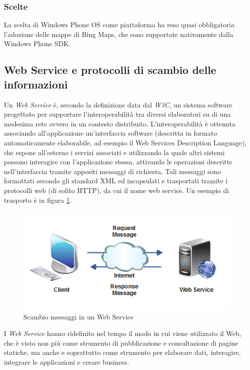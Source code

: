 \subsubsection{Scelte}
La scelta di Windows Phone OS come piattaforma ha reso quasi obbligatoria l'adozione delle mappe di Bing Maps, che sono supportate nativamente dalla Windows Phone SDK.

\clearpage{\pagestyle{empty}\cleardoublepage}

\subsection{Web Service e protocolli di scambio delle informazioni}
Un \textit{Web Service} è, secondo la definizione data dal \textit{W3C}, un sistema software progettato per supportare l'interoperabilità tra diversi elaboratori su di una medesima rete ovvero in un contesto distribuito. L'interoperabilità è ottenuta associando all'applicazione un'interfaccia software (descritta in formato automaticamente elaborabile, ad esempio il Web Services Description Language), che espone all'esterno i servizi associati e utilizzando la quale altri sistemi possono interagire con l'applicazione stessa, attivando le operazioni descritte nell'interfaccia tramite appositi messaggi di richiesta.
Tali messaggi sono formattati secondo gli standard XML ed incapsulati e trasportati tramite i protocolli web (di solito HTTP), da cui il nome web service. Un esempio di trasporto è in figura \ref{webservice}.
\begin{figure}
\begin{center}
\includegraphics[scale=1]{imgs/webservice.png} 
\caption{Scambio messaggi in un Web Service\label{webservice}}
\end{center}
\end{figure}
I \textit{Web Service} hanno ridefinito nel tempo il modo in cui viene utilizzato il Web, che è visto non più come strumento di pubblicazione e consultazione di pagine statiche, ma anche e soprattutto come strumento per elaborare dati, interagire, integrare le applicazioni e creare business.
